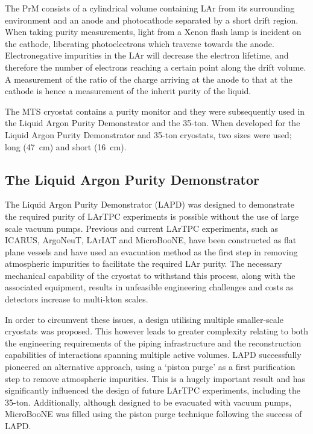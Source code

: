The PrM consists of a cylindrical volume containing LAr from its surrounding environment and an anode and photocathode separated by a short drift region.  When taking purity measurements, light from a Xenon flash lamp is incident on the cathode, liberating photoelectrons which traverse towards the anode.  Electronegative impurities in the LAr will decrease the electron lifetime, and therefore the number of electrons reaching a certain point along the drift volume.  A measurement of the ratio of the charge arriving at the anode to that at the cathode is hence a measurement of the inherit purity of the liquid.

The MTS cryostat contains a purity monitor and they were subsequently used in the Liquid Argon Purity Demonstrator and the 35-ton.  When developed for the Liquid Argon Purity Demonstrator and 35-ton cryostats, two sizes were used; long (47~cm) and short (16~cm).

\subsection{The Liquid Argon Purity Demonstrator}\label{sec:LAPD}

The Liquid Argon Purity Demonstrator (LAPD) \cite{MTS2011,LAPD2014,LAPDJINST2014} was designed to demonstrate the required purity of LArTPC experiments is possible without the use of large scale vacuum pumps.  Previous and current LArTPC experiments, such as ICARUS, ArgoNeuT, LArIAT and MicroBooNE, have been constructed as flat plane vessels and have used an evacuation method as the first step in removing atmospheric impurities to facilitate the required LAr purity.  The necessary mechanical capability of the cryostat to withstand this process, along with the associated equipment, results in unfeasible engineering challenges and costs as detectors increase to multi-kton scales.

In order to circumvent these issues, a design utilising multiple smaller-scale cryostats was proposed.  This however leads to greater complexity relating to both the engineering requirements of the piping infrastructure and the reconstruction capabilities of interactions spanning multiple active volumes.  LAPD successfully pioneered an alternative approach, using a `piston purge' as a first purification step to remove atmospheric impurities.  This is a hugely important result and has significantly influenced the design of future LArTPC experiments, including the 35-ton.  Additionally, although designed to be evacuated with vacuum pumps, MicroBooNE was filled using the piston purge technique following the success of LAPD.


